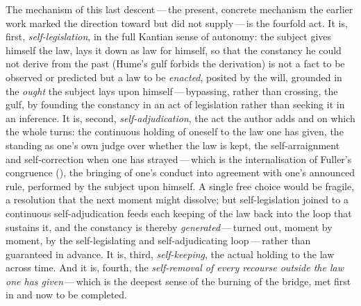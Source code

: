 The mechanism of this last descent\,---\,the present, concrete mechanism the earlier work marked the direction toward but did not supply\,---\,is the fourfold act. It is, first, \emph{self-legislation}, in the full Kantian sense of autonomy: the subject gives himself the law, lays it down as law for himself, so that the constancy he could not derive from the past (Hume's gulf forbids the derivation) is not a fact to be observed or predicted but a law to be \emph{enacted}, posited by the will, grounded in the \emph{ought} the subject lays upon himself\,---\,bypassing, rather than crossing, the gulf, by founding the constancy in an act of legislation rather than seeking it in an inference. It is, second, \emph{self-adjudication}, the act the author adds and on which the whole turns: the continuous holding of oneself to the law one has given, the standing as one's own judge over whether the law is kept, the self-arraignment and self-correction when one has strayed\,---\,which is the internalisation of Fuller's congruence (), the bringing of one's conduct into agreement with one's announced rule, performed by the subject upon himself. A single free choice would be fragile, a resolution that the next moment might dissolve; but self-legislation joined to a continuous self-adjudication feeds each keeping of the law back into the loop that sustains it, and the constancy is thereby \emph{generated}\,---\,turned out, moment by moment, by the self-legislating and self-adjudicating loop\,---\,rather than guaranteed in advance. It is, third, \emph{self-keeping}, the actual holding to the law across time. And it is, fourth, the \emph{self-removal of every recourse outside the law one has given}\,---\,which is the deepest sense of the burning of the bridge, met first in  and now to be completed.

